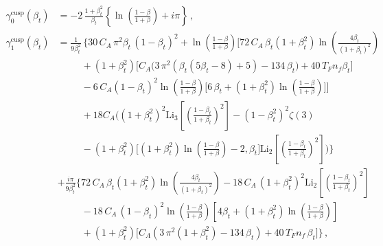 \documentclass[a4paper,11pt]{article}
\numberwithin{equation}{section}
\begin{document}
\begin{align}
  \label{eq:vel-dep-ad-explicit}
  \gamma^{\text{cusp}}_0(\beta_t) &= 
  -2\, \frac{1+\beta_t ^2}{\beta_t}
  \left\{\ln \left(\frac{1-\beta}{1+\beta}\right) + i \pi\right\}\,,
  \\
  \gamma^{\text{cusp}}_1(\beta_t) &= 
  \frac{1}{9 \beta_t ^2}\,
  \Bigg\{30\, C_A\, \pi ^2 \beta_t\,  (1-\beta_t)^2 +
  \ln \left(\frac{1-\beta}{1+\beta}\right) 
  \bigg[72\, C_A\, \beta_t \left(1+ \beta_t ^2\right) 
  \ln \left(\frac{4 \beta_t }{(1+ \beta_t)^2}\right)
  \nonumber \\
  &
  \hspace{30pt}
  +\left(1+\beta_t ^2\right)
  \Big[C_A \big(3\, \pi ^2 (\beta_t  (5 \beta_t -8)+5)-134\, \beta_t \big)+
  40\,  T_F n_f \beta_t \Big]
  \nonumber \\
  &
  \hspace{30pt}
  -6\, C_A (1-\beta_t)^2 \ln \left(\frac{1-\beta}{1+\beta}\right) 
  \Big[6\, \beta_t +\left(1+\beta_t ^2\right)
  \ln \left(\frac{1-\beta}{1+\beta}\right)\Big]\bigg]
  \nonumber \\
  & 
  \hspace{30pt}
  +18 C_A \Bigg(\left(1+\beta_t ^2\right)^2 
  \text{Li}_3\left[\left(\frac{1-\beta_t}{1+\beta_t}\right)^2\right]
  -\left(1-\beta_t ^2\right)^2 \zeta (3)
  \nonumber \\
  &
  \hspace{30pt}
  -\left(1+\beta_t ^2\right) 
  \Big[\left(1+\beta_t ^2\right) \ln
  \left(\frac{1-\beta}{1+\beta}\right)- 2, \beta_t \Big]
  \text{Li}_2\left[\left(\frac{1-\beta_t}{1+\beta_t}\right)^2\right]
  \Bigg)
  \Bigg\}
  \nonumber \\
  &
  + \frac{i \pi}{9 \beta_t ^2}
  \Bigg\{72\, C_A\, \beta_t  \left(1+\beta_t ^2\right) 
  \ln \left(\frac{4 \beta_t }{(1+\beta_t)^2}\right)
  -18\, C_A\, \left(1+\beta_t ^2\right)^2
  \text{Li}_2\left[\left(\frac{1-\beta_t}{1+\beta_t}\right)^2\right]
  \nonumber \\
  &
  \hspace{30pt}
  -18\, C_A\, (1-\beta_t)^2\ln 
  \left(\frac{1-\beta}{1+\beta}\right) \left[4 \beta_t
  +\left(1+\beta_t ^2\right) \ln
  \left(\frac{1-\beta}{1+\beta}\right)\right]
  \nonumber \\
  &
  \hspace{30pt}
  + \left(1+ \beta_t ^2\right) \Big[C_A  \left(3\,\pi ^2 
  \left(1+ \beta_t ^2\right)-134\, \beta_t \right) +40\,  T_F n_f\, \beta_t\Big]
  \Bigg\}
  \,,
\end{align}
\end{document}
